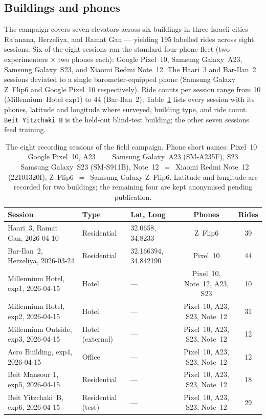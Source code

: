 \documentclass[manuscript,review,screen]{acmart}
\begin{document}
\subsection{Buildings and phones}
\label{app:dataset-buildings}

The campaign covers seven elevators across six buildings in three
Israeli cities --- Ra'anana, Herzeliya, and Ramat Gan --- yielding 195
labelled rides across eight sessions. Six of the eight sessions ran the
standard four-phone fleet (two experimenters $\times$ two phones each):
Google Pixel~10, Samsung Galaxy~A23, Samsung Galaxy~S23, and Xiaomi
Redmi Note~12. The Haari~3 and Bar-Ilan~2 sessions deviated to a
single barometer-equipped phone (Samsung Galaxy Z~Flip6 and Google
Pixel~10 respectively). Ride counts per session range from 10
(Millennium~Hotel exp1) to 44 (Bar-Ilan~2);
Table~\ref{tab:app-sessions} lists every session with its phones,
latitude and longitude where surveyed, building type, and ride count.
\texttt{Beit~Yitzchaki~B} is the held-out blind-test building; the
other seven sessions feed training.

\begin{table}[!htbp]
\centering
\small
\begin{tabular}{lllcc}
\toprule
\textbf{Session} & \textbf{Type} & \textbf{Lat, Long} & \textbf{Phones} & \textbf{Rides} \\
\midrule
Haari~3, Ramat Gan, 2026-04-10            & Residential        & 32.0658, 34.8233      & Z~Flip6                       & 39 \\
Bar-Ilan~2, Herzeliya, 2026-03-24         & Residential        & 32.166394, 34.842190  & Pixel~10                      & 44 \\
Millennium Hotel, exp1, 2026-04-15        & Hotel              & ---                   & Pixel~10, Note~12, A23, S23   & 10 \\
Millennium Hotel, exp2, 2026-04-15        & Hotel              & ---                   & Pixel~10, A23, S23, Note~12   & 31 \\
Millennium Outside, exp3, 2026-04-15      & Hotel (external)   & ---                   & Pixel~10, A23, S23, Note~12   & 12 \\
Acro Building, exp4, 2026-04-15           & Office             & ---                   & Pixel~10, A23, S23, Note~12   & 12 \\
Beit Mansour 1, exp5, 2026-04-15          & Residential        & ---                   & Pixel~10, A23, S23, Note~12   & 18 \\
Beit Yitzchaki~B, exp6, 2026-04-15        & Residential (test) & ---                   & Pixel~10, A23, S23, Note~12   & 29 \\
\bottomrule
\end{tabular}
\caption{The eight recording sessions of the field campaign. Phone
  short names: Pixel~10~$=$~Google Pixel~10,
  A23~$=$~Samsung Galaxy~A23 (SM-A235F),
  S23~$=$~Samsung Galaxy~S23 (SM-S911B),
  Note~12~$=$~Xiaomi Redmi Note~12 (22101320I),
  Z~Flip6~$=$~Samsung Galaxy Z~Flip6. Latitude and longitude are
  recorded for two buildings; the remaining four are kept anonymised
  pending publication.}
\label{tab:app-sessions}
\end{table}
\end{document}
